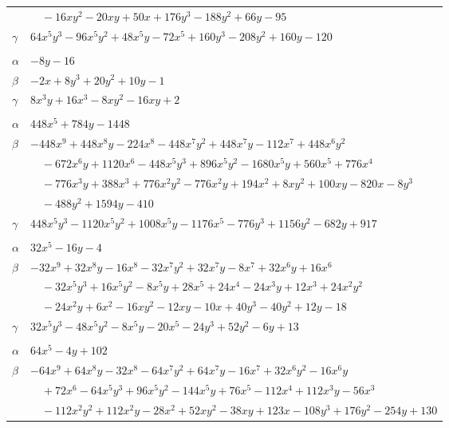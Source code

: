 \documentclass[11pt]{article}
\begin{document}
\begin{longtable}{@{}ll@{}}
 & $\quad -16xy^{2}-20xy+50x+176y^{3}-188y^{2}+66y-95$\\
$\gamma$ & $64x^{5}y^{3}-96x^{5}y^{2}+48x^{5}y-72x^{5}+160y^{3}-208y^{2}+160y-120$\\
\addlinespace[3pt]
\multicolumn{2}{@{}l}{$\{i,j\}=\{9,25\}$, $k_{ij}=17$}\\
$\alpha$ & $-8y-16$\\
$\beta$ & $-2x+8y^{3}+20y^{2}+10y-1$\\
$\gamma$ & $8x^{3}y+16x^{3}-8xy^{2}-16xy+2$\\
\addlinespace[3pt]
\multicolumn{2}{@{}l}{$\{i,j\}=\{9,28\}$, $k_{ij}=2^{3}\cdot 3$}\\
$\alpha$ & $448x^{5}+784y-1448$\\
$\beta$ & $-448x^{9}+448x^{8}y-224x^{8}-448x^{7}y^{2}+448x^{7}y-112x^{7}+448x^{6}y^{2}$\\
 & $\quad -672x^{6}y+1120x^{6}-448x^{5}y^{3}+896x^{5}y^{2}-1680x^{5}y+560x^{5}+776x^{4}$\\
 & $\quad -776x^{3}y+388x^{3}+776x^{2}y^{2}-776x^{2}y+194x^{2}+8xy^{2}+100xy-820x-8y^{3}$\\
 & $\quad -488y^{2}+1594y-410$\\
$\gamma$ & $448x^{5}y^{3}-1120x^{5}y^{2}+1008x^{5}y-1176x^{5}-776y^{3}+1156y^{2}-682y+917$\\
\addlinespace[3pt]
\multicolumn{2}{@{}l}{$\{i,j\}=\{9,33\}$, $k_{ij}=3^{2}$}\\
$\alpha$ & $32x^{5}-16y-4$\\
$\beta$ & $-32x^{9}+32x^{8}y-16x^{8}-32x^{7}y^{2}+32x^{7}y-8x^{7}+32x^{6}y+16x^{6}$\\
 & $\quad -32x^{5}y^{3}+16x^{5}y^{2}-8x^{5}y+28x^{5}+24x^{4}-24x^{3}y+12x^{3}+24x^{2}y^{2}$\\
 & $\quad -24x^{2}y+6x^{2}-16xy^{2}-12xy-10x+40y^{3}-40y^{2}+12y-18$\\
$\gamma$ & $32x^{5}y^{3}-48x^{5}y^{2}-8x^{5}y-20x^{5}-24y^{3}+52y^{2}-6y+13$\\
\addlinespace[3pt]
\multicolumn{2}{@{}l}{$\{i,j\}=\{9,34\}$, $k_{ij}=2\cdot 3\cdot 7$}\\
$\alpha$ & $64x^{5}-4y+102$\\
$\beta$ & $-64x^{9}+64x^{8}y-32x^{8}-64x^{7}y^{2}+64x^{7}y-16x^{7}+32x^{6}y^{2}-16x^{6}y$\\
 & $\quad +72x^{6}-64x^{5}y^{3}+96x^{5}y^{2}-144x^{5}y+76x^{5}-112x^{4}+112x^{3}y-56x^{3}$\\
 & $\quad -112x^{2}y^{2}+112x^{2}y-28x^{2}+52xy^{2}-38xy+123x-108y^{3}+176y^{2}-254y+130$\\

\end{longtable}
\end{document}
